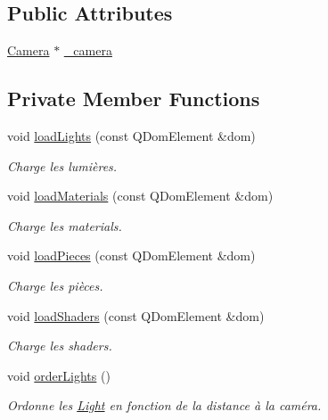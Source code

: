\subsection*{Public Attributes}
\begin{DoxyCompactItemize}
\item 
\hyperlink{class_camera}{Camera} $\ast$ \hyperlink{class_scene_a8cce9e0f96edc8655a9b9a885e2c26bf}{\+\_\+camera}
\end{DoxyCompactItemize}
\subsection*{Private Member Functions}
\begin{DoxyCompactItemize}
\item 
void \hyperlink{class_scene_a34446952ed460f5a66a90649d6f743ec}{load\+Lights} (const Q\+Dom\+Element \&dom)
\begin{DoxyCompactList}\small\item\em Charge les lumières. \end{DoxyCompactList}\item 
void \hyperlink{class_scene_a8fe39b5221775362f28c78129292e162}{load\+Materials} (const Q\+Dom\+Element \&dom)
\begin{DoxyCompactList}\small\item\em Charge les materials. \end{DoxyCompactList}\item 
void \hyperlink{class_scene_aa6d40bab1b160afc7bb84841d056a07d}{load\+Pieces} (const Q\+Dom\+Element \&dom)
\begin{DoxyCompactList}\small\item\em Charge les pièces. \end{DoxyCompactList}\item 
void \hyperlink{class_scene_a1deb5bb022836f4b585c8580246b26cb}{load\+Shaders} (const Q\+Dom\+Element \&dom)
\begin{DoxyCompactList}\small\item\em Charge les shaders. \end{DoxyCompactList}\item 
void \hyperlink{class_scene_ae6fc45f015d96191dbf775d54d6e4437}{order\+Lights} ()
\begin{DoxyCompactList}\small\item\em Ordonne les \hyperlink{class_light}{Light} en fonction de la distance à la caméra. \end{DoxyCompactList}\item 

\end{DoxyCompactItemize}
